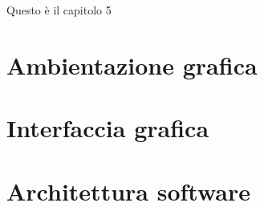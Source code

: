 Questo è il capitolo 5
\section{Ambientazione grafica}
\section{Interfaccia grafica}
\section{Architettura software}